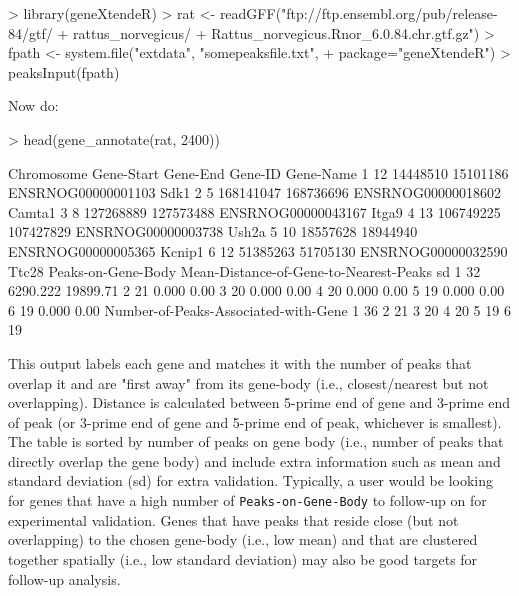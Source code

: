 \documentclass[12pt]{article}
\begin{document}
\begin{Schunk}
\begin{Sinput}
> library(geneXtendeR)
> rat <- readGFF("ftp://ftp.ensembl.org/pub/release-84/gtf/
+                       rattus_norvegicus/
+                       Rattus_norvegicus.Rnor_6.0.84.chr.gtf.gz")
> fpath <- system.file("extdata", "somepeaksfile.txt", 
+                      package="geneXtendeR")
> peaksInput(fpath)
\end{Sinput}
\end{Schunk}

Now do:

\begin{Schunk}
\begin{Sinput}
> head(gene_annotate(rat, 2400))
\end{Sinput}
\begin{Soutput}
  Chromosome Gene-Start  Gene-End            Gene-ID Gene-Name
1         12   14448510  15101186 ENSRNOG00000001103      Sdk1
2          5  168141047 168736696 ENSRNOG00000018602    Camta1
3          8  127268889 127573488 ENSRNOG00000043167     Itga9
4         13  106749225 107427829 ENSRNOG00000003738     Ush2a
5         10   18557628  18944940 ENSRNOG00000005365    Kcnip1
6         12   51385263  51705130 ENSRNOG00000032590     Ttc28
  Peaks-on-Gene-Body Mean-Distance-of-Gene-to-Nearest-Peaks       sd
1                 32                               6290.222 19899.71
2                 21                                  0.000     0.00
3                 20                                  0.000     0.00
4                 20                                  0.000     0.00
5                 19                                  0.000     0.00
6                 19                                  0.000     0.00
  Number-of-Peaks-Associated-with-Gene
1                                   36
2                                   21
3                                   20
4                                   20
5                                   19
6                                   19
\end{Soutput}
\end{Schunk}

This output labels each gene and matches it with the number of peaks that overlap it and are "first away" from its gene-body (i.e., closest/nearest but not overlapping).  Distance is calculated between 5-prime end of gene and 3-prime end of peak (or 3-prime end of gene and 5-prime end of peak, whichever is smallest).  The table is sorted by number of peaks on gene body (i.e., number of peaks that directly overlap the gene body) and include extra information such as mean and standard deviation (sd) for extra validation.  Typically, a user would be looking for genes that have a high number of \texttt{Peaks-on-Gene-Body} to follow-up on for experimental validation. Genes that have peaks that reside close (but not overlapping) to the chosen gene-body (i.e., low mean) and that are clustered together spatially (i.e., low standard deviation) may also be good targets for follow-up analysis. 
\end{document}
